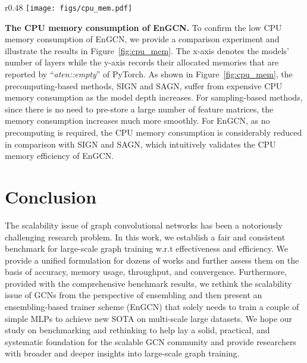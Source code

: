 \message{ !name(main.tex)}\documentclass{article}
\begin{document}
\begin{wrapfigure}{r}{0.48\linewidth}
	\vspace{-3mm}
	\centering
	\texttt{[image: figs/cpu\_mem.pdf]}
	\vspace{-3mm}
	\caption{The allocated CPU memory of EnGCN and selected baselines on Flickr.}
	\vspace{-2mm}
	\label{fig:cpu_mem}
\end{wrapfigure}
\textbf{The CPU memory consumption of EnGCN.}
To confirm the low CPU memory consumption of EnGCN, we provide a comparison experiment and illustrate the results in Figure~\ref{fig:cpu_mem}. The x-axis denotes the models' number of layers while the y-axis records their allocated memories that are reported by ``\textit{aten::empty}'' of PyTorch. As shown in Figure~\ref{fig:cpu_mem}, the precomputing-based methods, SIGN and SAGN, suffer from expensive CPU memory consumption as the model depth increases. For sampling-based methods, since there is no need to pre-store a large number of feature matrices, the memory consumption increases much more smoothly. For EnGCN, as no precomputing is required, the CPU memory consumption is considerably reduced in comparison with SIGN and SAGN, which intuitively validates the CPU memory efficiency of EnGCN.

\vspace{-3mm}
\section{Conclusion}
\vspace{-2mm}
The scalability issue of graph convolutional networks has been a notoriously challenging research problem. In this work, we establish a fair and consistent benchmark for large-scale graph training w.r.t effectiveness and efficiency. We provide a unified formulation for dozens of works and further assess them on the basis of accuracy, memory usage, throughput, and convergence. Furthermore, provided with the comprehensive benchmark results, we rethink the scalability issue of GCNs from the perspective of ensembling and then present an ensembling-based trainer scheme (EnGCN) that solely needs to train a couple of simple MLPs to achieve new SOTA on multi-scale large datasets. We hope our study on benchmarking and rethinking to help lay a solid, practical, and systematic foundation for the scalable GCN community and provide researchers with broader and deeper insights into large-scale graph training.
\end{document}

